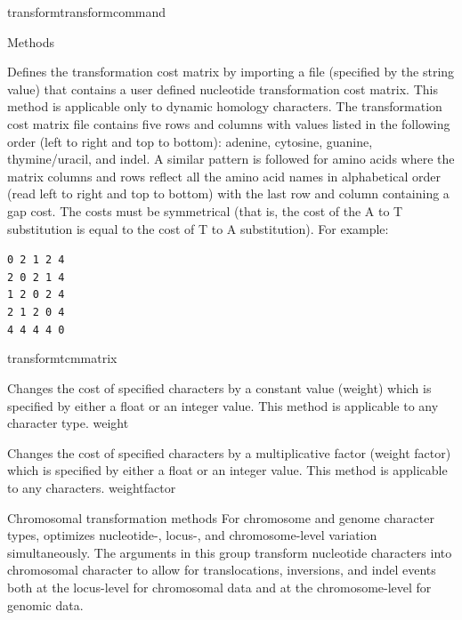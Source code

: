 \begin{command}{transform}{transformcommand}
\begin{arguments}
\begin{argumentgroup}{Methods}
            {Defines the transformation cost matrix by importing a file (specified by
            the string value) that contains a user defined nucleotide
            transformation cost matrix. This method is applicable only to dynamic homology characters.
            The transformation cost matrix file contains five rows and columns
            with values listed in the following order (left to right and top to
            bottom): adenine, cytosine, guanine,
            thymine/uracil, and indel.  A similar pattern is followed for amino acids
            where the matrix columns and rows reflect all the amino acid names in alphabetical order
            (read left to right and top to bottom) with the last row and column containing a gap cost. 
            The costs must be symmetrical (that is, the
            cost of the A to T substitution is equal to the cost of T to A
            substitution). For example:
	        \begin{center}
            \texttt{0 2 1 2 4 \\
            2 0 2 1 4 \\
            1 2 0 2 4 \\
            2 1 2 0 4 \\
            4 4 4 4 0} 
            \end{center}
            }
            {transformtcmmatrix}

            {Changes the cost of specified characters by a
            constant value (weight) which is specified by either a
            float or an integer value. This method is applicable to any character type.} 
            {weight}

            {Changes the cost of specified characters by a
            multiplicative factor (weight factor) which is specified by either a
            float or an integer value. This method is applicable to any characters.} 
            {weightfactor}

      \end{argumentgroup}
           
       \begin{argumentgroup}{Chromosomal transformation methods}
           For chromosome and genome character types, \poy optimizes nucleotide-, 
           locus-, and chromosome-level variation simultaneously. The arguments in this group
           transform nucleotide characters into chromosomal character
           to allow for translocations, inversions, and indel events both at the locus-level for chromosomal data
           and at the chromosome-level for genomic data.
           

\end{argumentgroup}
\end{arguments}
\end{command}
